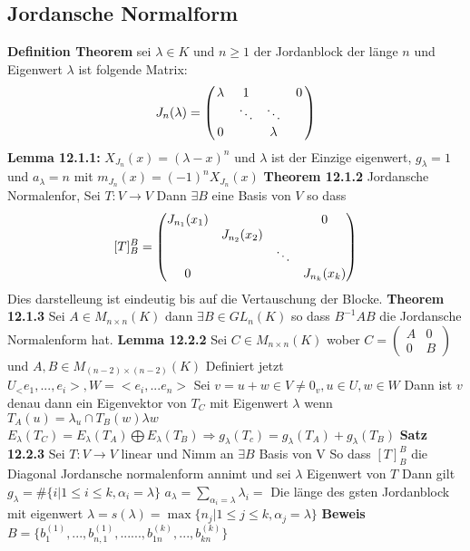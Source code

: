 \documentclass{article}
\newcommand{\smspc}{\hspace{0.3cm}}
\begin{document}
\subsection{Jordansche Normalform} \textbf{Definition  Theorem} sei $\lambda\in K$ und $n\ge1$ der Jordanblock der länge $n$ und Eigenwert $\lambda$ ist folgende Matrix:\[J_n(\lambda)=\begin{pmatrix}\lambda&1&\smspc&0\\\smspc&\ddots&\ddots&\smspc\\0&\smspc&\lambda\end{pmatrix}\]
\textbf{Lemma 12.1.1:} $X_{J_n}(x)=(\lambda-x)^n$ und $\lambda$ ist der Einzige eigenwert, $g_\lambda=1$ und $a_\lambda=n$ mit $m_{J_n}(x)=(-1)^nX_{J_n}(x)$ \newline
\textbf{Theorem 12.1.2} Jordansche Normalenfor, Sei $T:V\rightarrow V$ Dann $\exists B$ eine Basis von $V$ so dass 
\[[T]^B_B=\begin{pmatrix}J_{n_1}(x_1)&\smspc&\smspc&0\\\smspc&J_{n_2}(x_2)&\smspc&\smspc\\\smspc&\smspc&\ddots&\smspc\\0&\smspc&\smspc&J_{n_k}(x_k)\end{pmatrix}\]
Dies darstelleung ist eindeutig bis auf die Vertauschung der Blocke. \newline
\textbf{Theorem 12.1.3} Sei $A\in M_{n\times n} (K)$ dann $\exists B\in GL_n(K)$ so dass $B^{-1}AB$ die Jordansche Normalenform hat.
\textbf{Lemma 12.2.2} Sei $C\in M_{n\times n}(K)$ wober $C=\begin{pmatrix}A&0\\0&B\end{pmatrix}$ und $A,B\in M_{(n-2)\times (n-2)}(K)$ Definiert jetzt $U_<e_1,...,e_i>,W=<e_i,...e_n>$ 
Sei $v=u+w\in V\neq0_v,u\in U,w\in W$ Dann ist $v$ denau dann ein Eigenvektor von $T_C$ mit Eigenwert $\lambda$ wenn $T_A(u)=\lambda_u \cap T_B(w)\lambda w$ 
$E_\lambda (T_C)=E_\lambda(T_A)\bigoplus E_\lambda(T_B)\Rightarrow g_\lambda(T_c)=g_\lambda(T_A)+g_\lambda(T_B)$
\newline\textbf{Satz 12.2.3} Sei $T:V\rightarrow V$ linear und Nimm an $\exists B$ Basis von V So dass $[T]^B_B$ die Diagonal Jordansche normalenform annimt und sei $\lambda$ Eigenwert von $T$ Dann gilt $g_\lambda=\#\lbrace i|1\le i\le k, \alpha_i=\lambda\rbrace$
$a_\lambda=\sum_{\alpha_i=\lambda}\lambda_i=$ Die länge des gsten Jordanblock mit eigenwert $\lambda =s(\lambda)=\max\lbrace n_j|1\le j\le k, \alpha_j=\lambda\rbrace$
\newline\textbf{Beweis} $B=\lbrace b_1^{(1)},...,b_{n,1}^{(1)}, ...... ,b_{1n}^{(k)},...,b_{kn}^{(k)}\rbrace$
\end{document}
